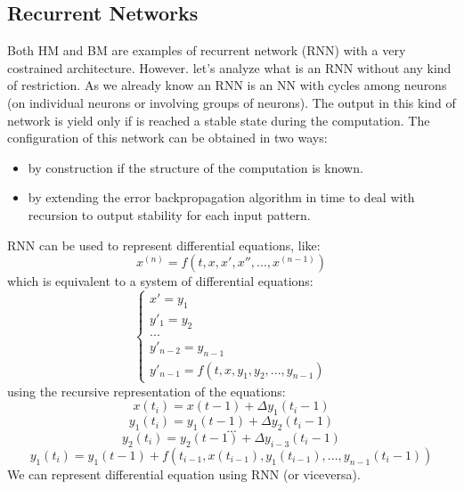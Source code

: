 \documentclass{article}
\begin{document}
\subsection{Recurrent Networks}
Both HM and BM are examples of recurrent network (RNN) with a very costrained architecture. However.
let's analyze what is an RNN without any kind of restriction. As we already know an RNN is an
NN with cycles among neurons (on individual neurons or involving groups of neurons).
\newline\newline
The output in this kind of network is yield only if is reached a stable state during the
computation.
\newline\newline
The configuration of this network can be obtained in two ways:
\begin{itemize}
    \item by construction if the structure of the computation is known.
    \item by extending the error backpropagation algorithm in time to deal with recursion
          to output stability for each input pattern.
\end{itemize}
RNN can be used to represent differential equations, like:
$$x^{(n)}=f(t,x,x',x'',...,x^{(n-1)})$$
which is equivalent to a system of differential equations:
\[
    \begin{cases}
        x'=y_1           \\
        y'_1= y_2        \\
        ...              \\
        y'_{n-2}=y_{n-1} \\
        y'_{n-1}=f(t,x,y_1,y_2,...,y_{n-1})
    \end{cases}
\]
using the recursive representation of the equations:
$$    x(t_i)=x(t-1)+\Delta y_1(t_i -1)$$
$$    y_1(t_i)=y_1(t-1)+\Delta y_2(t_i -1)$$
$$   ...$$
$$y_2(t_i)=y_2(t-1)+\Delta y_{i-3}(t_i -1)$$
$$y_1(t_i)=y_1(t-1)+ f(t_{i-1}, x(t_{i-1}), y_1(t_{i-1}),..., y_{n-1}(t_i -1))$$
We can represent differential equation using RNN (or viceversa).
\end{document}
